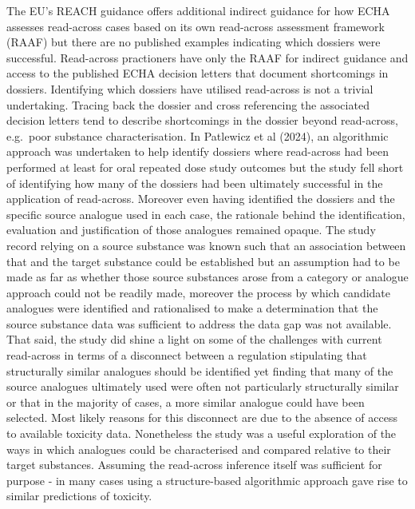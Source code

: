 \documentclass[
  super,
  preprint,
  3p]{elsarticle}
\begin{document}
The EU's REACH guidance offers additional indirect guidance for how ECHA
assesses read-across cases based on its own read-across assessment
framework (RAAF) but there are no published examples indicating which
dossiers were successful. Read-across practioners have only the RAAF for
indirect guidance and access to the published ECHA decision letters that
document shortcomings in dossiers. Identifying which dossiers have
utilised read-across is not a trivial undertaking. Tracing back the
dossier and cross referencing the associated decision letters tend to
describe shortcomings in the dossier beyond read-across, e.g.~poor
substance characterisation. In Patlewicz et al (2024), an algorithmic
approach was undertaken to help identify dossiers where read-across had
been performed at least for oral repeated dose study outcomes but the
study fell short of identifying how many of the dossiers had been
ultimately successful in the application of read-across. Moreover even
having identified the dossiers and the specific source analogue used in
each case, the rationale behind the identification, evaluation and
justification of those analogues remained opaque. The study record
relying on a source substance was known such that an association between
that and the target substance could be established but an assumption had
to be made as far as whether those source substances arose from a
category or analogue approach could not be readily made, moreover the
process by which candidate analogues were identified and rationalised to
make a determination that the source substance data was sufficient to
address the data gap was not available. That said, the study did shine a
light on some of the challenges with current read-across in terms of a
disconnect between a regulation stipulating that structurally similar
analogues should be identified yet finding that many of the source
analogues ultimately used were often not particularly structurally
similar or that in the majority of cases, a more similar analogue could
have been selected. Most likely reasons for this disconnect are due to
the absence of access to available toxicity data. Nonetheless the study
was a useful exploration of the ways in which analogues could be
characterised and compared relative to their target substances. Assuming
the read-across inference itself was sufficient for purpose - in many
cases using a structure-based algorithmic approach gave rise to similar
predictions of toxicity.
\end{document}
